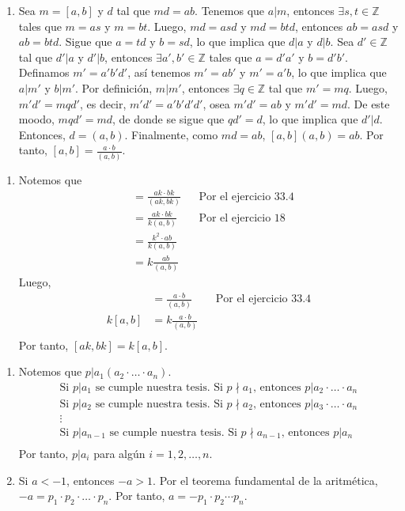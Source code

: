 \documentclass[11pt]{article}
\newcommand{\Z}{\mathbb{Z}}
\begin{document}
\begin{enumerate}[label=33.4]
\item Sea $m=[a,b]$ y $d$ tal que $md=ab$. Tenemos que $a|m$, entonces $\exists s,t \in \Z$ tales que $m=as$ y $m=bt$. Luego, $md=asd$ y $md=btd$, entonces $ab=asd$ y $ab=btd$. Sigue que $a=td$ y $b=sd$, lo que implica que $d|a$ y $d|b$. Sea $d'\in\Z$ tal que $d'|a$ y $d'|b$, entonces $\exists a',b'\in \Z$ tales que $a=d'a'$ y $b=d'b'$. Definamos $m'=a'b'd'$, así tenemos $m'=ab'$ y $m'=a'b$, lo que implica que $a|m'$ y $b|m'$. Por definición, $m|m'$, entonces $\exists q\in \Z$ tal que $m'=mq$. Luego, $m'd'=mqd'$, es decir, $m'd'=a'b'd'd'$, osea $m'd'=ab$ y $m'd'=md$. De este moodo, $mqd'=md$, de donde se sigue que $qd'=d$, lo que implica que $d'|d$. Entonces, $d=(a,b)$. Finalmente, como $md=ab$, $[a,b](a,b)=ab$. Por tanto, $[a,b]=\frac{a \cdot b}{(a,b)}$.
\end{enumerate}

\begin{enumerate}[label=33.5]
  \item Notemos que
  \begin{align*}
    [ak,bk] &= \frac{ak \cdot bk}{(ak,bk)} && \text{Por el ejercicio 33.4}\\
    &= \frac{ak \cdot bk}{k(a,b)} && \text{Por el ejercicio 18}\\
    &= \frac{k^2 \cdot ab}{k(a,b)} \\
    &= k \frac{ab}{(a,b)}
  \end{align*}
Luego,
\begin{align*}
  [a,b] &= \frac{a \cdot b}{(a,b)} && \text{Por el ejercicio 33.4} \\
  k[a,b] &= k \frac{a \cdot b}{(a,b)} \\
\end{align*}
Por tanto, $[ak,bk]=k[a,b]$.
\end{enumerate}

\begin{enumerate}[start=37]
  \item Notemos que $p|a_1(a_2 \cdot \ldots \cdot a_n)$.
    \begin{gather*}
      \text{Si $p|a_1$ se cumple nuestra tesis. Si $p \nmid   a_1$, entonces $p|a_2 \cdot \ldots \cdot a_n$} \\
      \text{Si $p|a_2$ se cumple nuestra tesis. Si $p \nmid   a_2$, entonces $p|a_3 \cdot \ldots \cdot a_n$} \\
      \vdots \\
      \text{Si $p|a_{n-1}$ se cumple nuestra tesis. Si $p   \nmid a_{n-1}$, entonces $p|a_n$} \\
    \end{gather*}
    Por tanto, $p|a_i$ para algún $i=1,2,\dots,n$.
  \item Si $a<-1$, entonces $-a>1$. Por el teorema fundamental de la aritmética, $-a=p_1\cdot p_2 \cdot \ldots \cdot p_n$. Por tanto, $a=-p_1\cdot p_2 \cdots p_n$.
\end{enumerate}
\end{document}
